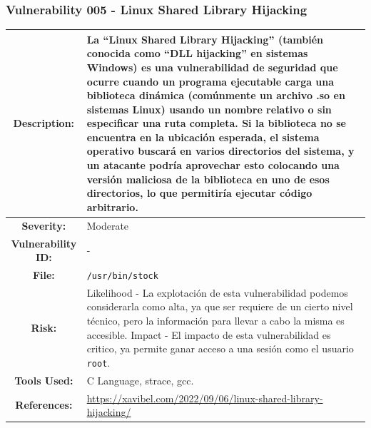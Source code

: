 \documentclass[a4paper]{article} %
\begin{document}
    \clearpage

    \subsubsection{\textbf{Vulnerability 005 - Linux Shared Library Hijacking}}
    \begin{table}[htbp]
        \begin{tabularx}{\textwidth}{|c|X|}
            \hline
            \cellcolor{lightgray}\textbf{Description:} & 
            {
                La “Linux Shared Library Hijacking” (también conocida como “DLL hijacking” en sistemas Windows) es una vulnerabilidad de seguridad que ocurre cuando un programa ejecutable carga una biblioteca dinámica (comúnmente un archivo .so en sistemas Linux) usando un nombre relativo o sin especificar una ruta completa. Si la biblioteca no se encuentra en la ubicación esperada, el sistema operativo buscará en varios directorios del sistema, y un atacante podría aprovechar esto colocando una versión maliciosa de la biblioteca en uno de esos directorios, lo que permitiría ejecutar código arbitrario.
            } \\
            \hline
            \cellcolor{lightgray}\textbf{Severity:} &
            {
                Moderate
            } \\
            \hline
            \cellcolor{lightgray}\textbf{Vulnerability ID:} &
            {-} \\
            \hline
            \cellcolor{lightgray}\textbf{File:} &
            {
                \texttt{/usr/bin/stock}
            } \\
            \hline
            \cellcolor{lightgray}\textbf{Risk:} &
            {
                Likelihood - La explotación de esta vulnerabilidad podemos considerarla como alta, ya que ser requiere de un cierto nivel técnico, pero la información para llevar a cabo la misma es accesible.
                \newline
                Impact - El impacto de esta vulnerabilidad es critico, ya permite ganar acceso a una sesión como el usuario \texttt{root}.
            } \\
            \hline
            \cellcolor{lightgray}\textbf{Tools Used:} &
            {
                C Language, strace, gcc.
            } \\
            \hline
            \cellcolor{lightgray}\textbf{References:} &        
            {
                \href{https://xavibel.com/2022/09/06/linux-shared-library-hijacking/}{https://xavibel.com/2022/09/06/linux-shared-library-hijacking/}

            } \\
            \hline
        \end{tabularx}
    \end{table}
    
\end{document}
